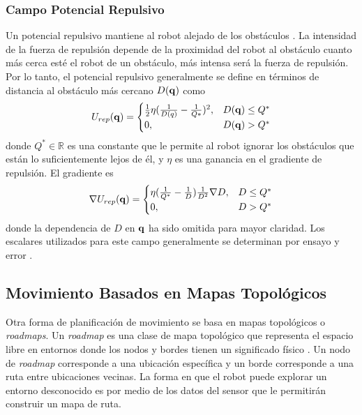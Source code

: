 \subsubsection{Campo Potencial Repulsivo}
Un potencial repulsivo mantiene al robot alejado de los obstáculos 
\cite{koren1991potential}. La intensidad de la fuerza de repulsión depende de la 
proximidad del robot al obstáculo cuanto más cerca esté el robot de un 
obstáculo, más intensa será la fuerza de repulsión. Por lo tanto, el 
potencial repulsivo generalmente se define en términos de distancia al 
obstáculo más cercano $D(\mathbf q)$ como 
\begin{equation}
U_{rep}(\mathbf q) =
\begin{cases}
	\frac{1}{2}\eta(\frac{1}{D(q)} - \frac{1}{Q*})^2, & D(\mathbf q)\leq Q^* \\
	0, & D(\mathbf q) > Q^*
\end{cases}
\label{eq:pot_rep}
\end{equation}
donde $Q^* \in \mathbb R$ es una constante que le permite al robot ignorar 
los obst\'aculos que est\'an lo suficientemente lejos de \'el, y $\eta$ es 
una ganancia en el gradiente de repulsi\'on. El gradiente es 
\begin{equation}
\nabla U_{rep}(\mathbf q) =
\begin{cases}
	\eta(\frac{1}{Q^*} - \frac{1}{D})\frac{1}{D^2} \nabla D, & D \leq Q^* \\
	0, & D > Q^*
\end{cases}
\label{eqn:gradient_rep}
\end{equation}
donde la dependencia de $D$ en $\mathbf q$ ha sido omitida para mayor claridad. Los 
escalares utilizados para este campo generalmente se determinan por ensayo 
y error \cite{choset2005principles}.

\subsection{Movimiento Basados en Mapas Topológicos} %
Otra forma de planificación de movimiento se basa en mapas topológicos o 
\textit{roadmaps}. Un \textit{roadmap} es una clase de mapa topológico que representa el 
espacio libre en entornos donde los nodos y bordes tienen un significado 
físico \cite{choset2005RoadMap}. Un nodo de \textit{roadmap} corresponde a una 
ubicación específica y un borde corresponde a una ruta entre ubicaciones 
vecinas. La forma en que el robot puede explorar un entorno desconocido es 
por medio de los datos del sensor que le permitirán construir un mapa de ruta.

